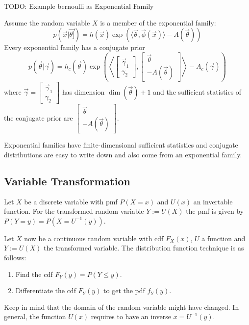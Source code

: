 TODO: Example bernoulli as Exponential Family

Assume the random variable $X$ is a member of the exponential family:
\begin{equation*}
    p(\vec{x} | \vec{\theta]}) =
    h(\vec{x})
        \exp(\langle \vec{\theta}, \vec{\phi}(\vec{x}) \rangle - A(\vec{\theta}))
\end{equation*}
Every exponential family has a conjugate prior
\begin{equation*}
    p(\vec{\theta} | \vec{\gamma}) =
    h_c(\vec{\theta}) \exp\left(
        \left\langle 
            \begin{bmatrix}
                \vec{\gamma}_1 \\
                \gamma_2
            \end{bmatrix},
            \begin{bmatrix}
                \vec{\theta} \\
                -A(\vec{\theta})
            \end{bmatrix}
        \right\rangle
        - A_c(\vec{\gamma})
    \right)
\end{equation*}
where $\vec{\gamma} = 
\begin{bmatrix}
    \vec{\gamma}_1 \\
    \gamma_2
\end{bmatrix}$ has dimension $\dim(\vec{\theta}) + 1$
and the sufficient statistics of the conjugate prior are
$\begin{bmatrix}
    \vec{\theta} \\
    -A(\vec{\theta})
\end{bmatrix}$.

Exponential families have finite-dimensional sufficient statistics
and conjugate distributions are easy to write down and also come
from an exponential family.


\subsection{Variable Transformation}
Let $X$ be a discrete variable with pmf $P(X = x)$ and
$U(x)$ an invertable function.
For the transformed random variable $Y := U(X)$ the pmf is given by
$P(Y = y) = P(X = U^{-1}(y))$.

Let $X$ now be a continuous random variable with cdf $F_X(x)$,
$U$ a function and $Y := U(X)$ the transformed variable.
The distribution function technique is as follows:
\begin{enumerate}
    \item Find the cdf $F_Y(y) = P(Y \leq y)$.
    \item Differentiate the cdf $F_Y(y)$ to get the pdf $f_Y(y)$.
\end{enumerate}
Keep in mind that the domain of the random variable might have changed.
In general, the function $U(x)$ requires to have an inverse
$x = U^{-1}(y)$.

